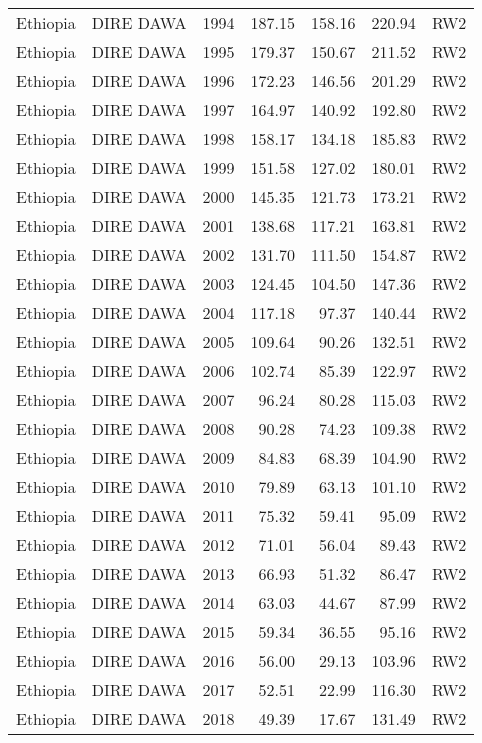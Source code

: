 \begin{longtable}{lllrrrl}
  Ethiopia & DIRE DAWA & 1994 & 187.15 & 158.16 & 220.94 & RW2 \\ 
  Ethiopia & DIRE DAWA & 1995 & 179.37 & 150.67 & 211.52 & RW2 \\ 
  Ethiopia & DIRE DAWA & 1996 & 172.23 & 146.56 & 201.29 & RW2 \\ 
  Ethiopia & DIRE DAWA & 1997 & 164.97 & 140.92 & 192.80 & RW2 \\ 
  Ethiopia & DIRE DAWA & 1998 & 158.17 & 134.18 & 185.83 & RW2 \\ 
  Ethiopia & DIRE DAWA & 1999 & 151.58 & 127.02 & 180.01 & RW2 \\ 
  Ethiopia & DIRE DAWA & 2000 & 145.35 & 121.73 & 173.21 & RW2 \\ 
  Ethiopia & DIRE DAWA & 2001 & 138.68 & 117.21 & 163.81 & RW2 \\ 
  Ethiopia & DIRE DAWA & 2002 & 131.70 & 111.50 & 154.87 & RW2 \\ 
  Ethiopia & DIRE DAWA & 2003 & 124.45 & 104.50 & 147.36 & RW2 \\ 
  Ethiopia & DIRE DAWA & 2004 & 117.18 & 97.37 & 140.44 & RW2 \\ 
  Ethiopia & DIRE DAWA & 2005 & 109.64 & 90.26 & 132.51 & RW2 \\ 
  Ethiopia & DIRE DAWA & 2006 & 102.74 & 85.39 & 122.97 & RW2 \\ 
  Ethiopia & DIRE DAWA & 2007 & 96.24 & 80.28 & 115.03 & RW2 \\ 
  Ethiopia & DIRE DAWA & 2008 & 90.28 & 74.23 & 109.38 & RW2 \\ 
  Ethiopia & DIRE DAWA & 2009 & 84.83 & 68.39 & 104.90 & RW2 \\ 
  Ethiopia & DIRE DAWA & 2010 & 79.89 & 63.13 & 101.10 & RW2 \\ 
  Ethiopia & DIRE DAWA & 2011 & 75.32 & 59.41 & 95.09 & RW2 \\ 
  Ethiopia & DIRE DAWA & 2012 & 71.01 & 56.04 & 89.43 & RW2 \\ 
  Ethiopia & DIRE DAWA & 2013 & 66.93 & 51.32 & 86.47 & RW2 \\ 
  Ethiopia & DIRE DAWA & 2014 & 63.03 & 44.67 & 87.99 & RW2 \\ 
  Ethiopia & DIRE DAWA & 2015 & 59.34 & 36.55 & 95.16 & RW2 \\ 
  Ethiopia & DIRE DAWA & 2016 & 56.00 & 29.13 & 103.96 & RW2 \\ 
  Ethiopia & DIRE DAWA & 2017 & 52.51 & 22.99 & 116.30 & RW2 \\ 
  Ethiopia & DIRE DAWA & 2018 & 49.39 & 17.67 & 131.49 & RW2 \\ 

\end{longtable}
